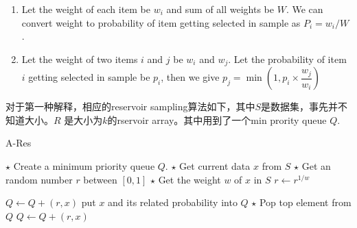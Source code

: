 \begin{enumerate}
\item Let the weight of each item be $w_i$ and sum of all weights be $ W $.  We can convert weight to probability of item getting selected in sample as $P_i=w_i/W$.
\item  Let the weight of two items $ i $ and $ j $ be $w_i$ and $w_j$.  Let the probability of item $ i $ getting selected in sample be $p_i$, then we give $p_j=\min(1, p_i\times \dfrac{w_j}{w_i})$
\end{enumerate}

对于第一种解释，相应的reservoir sampling算法如下，其中$S$是数据集，事先并不知道大小。$R$ 是大小为$k$的rservoir array。其中用到了一个min prority queue $Q$.
\begin{algorithm}[H]
\caption{A-Res}
\begin{algorithmic}[1]
\State $\star$ Create a minimum priority queue $Q$.
\State $\star$ Get current data $x$ from $S$
\State $\star$ Get an random number $r$ between $[0,1]$
\State $\star$ Get the weight $w$ of $x$ in $S$
\State $r\gets r^{1/w}$
\end{algorithmic}
\end{algorithm}
\begin{algorithm}[H]
\begin{algorithmic}[1]
\State $Q\gets Q + (r, x)$ \Comment put $x$ and its related probability into $Q$
\Else
{}
\State $\star$ Pop top element from $ Q $
\State $Q\gets Q + (r, x)$
\EndIf
\EndIf
\EndWhile
\EndProcedure
\end{algorithmic}
\end{algorithm}

